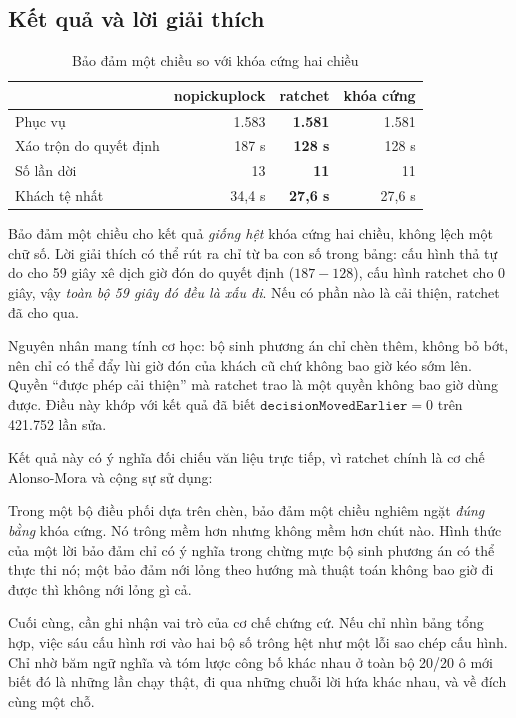 \subsection{Kết quả và lời giải thích}

\begin{table}[htbp]
\centering
\caption{Bảo đảm một chiều so với khóa cứng hai chiều}
\label{bang:ratchet}
\small
\begin{tabular}{@{}lrrr@{}}
\toprule
& \textbf{nopickuplock} & \textbf{ratchet} & \textbf{khóa cứng}\\
\midrule
Phục vụ & 1.583 & \textbf{1.581} & 1.581\\
Xáo trộn do quyết định & 187 s & \textbf{128 s} & 128 s\\
Số lần dời & 13 & \textbf{11} & 11\\
Khách tệ nhất & 34{,}4 s & \textbf{27{,}6 s} & 27{,}6 s\\
\bottomrule
\end{tabular}
\end{table}

Bảo đảm một chiều cho kết quả \emph{giống hệt} khóa cứng hai chiều, không lệch một chữ số. Lời
giải thích có thể rút ra chỉ từ ba con số trong bảng: cấu hình thả tự do cho 59 giây xê dịch giờ
đón do quyết định ($187 - 128$), cấu hình ratchet cho 0 giây, vậy \emph{toàn bộ 59 giây đó đều
là xấu đi}. Nếu có phần nào là cải thiện, ratchet đã cho qua.

Nguyên nhân mang tính cơ học: bộ sinh phương án chỉ chèn thêm, không bỏ bớt, nên chỉ có thể đẩy
lùi giờ đón của khách cũ chứ không bao giờ kéo sớm lên. Quyền ``được phép cải thiện'' mà ratchet
trao là một quyền không bao giờ dùng được. Điều này khớp với kết quả đã biết
$\mathtt{decisionMovedEarlier} = 0$ trên 421.752 lần sửa.

Kết quả này có ý nghĩa đối chiếu văn liệu trực tiếp, vì ratchet chính là cơ chế Alonso-Mora và
cộng sự sử dụng:

\begin{khungy}
Trong một bộ điều phối dựa trên chèn, bảo đảm một chiều nghiêm ngặt \emph{đúng bằng} khóa cứng.
Nó trông mềm hơn nhưng không mềm hơn chút nào. Hình thức của một lời bảo đảm chỉ có ý nghĩa
trong chừng mực bộ sinh phương án có thể thực thi nó; một bảo đảm nới lỏng theo hướng mà thuật
toán không bao giờ đi được thì không nới lỏng gì cả.
\end{khungy}

Cuối cùng, cần ghi nhận vai trò của cơ chế chứng cứ. Nếu chỉ nhìn bảng tổng hợp, việc sáu cấu
hình rơi vào hai bộ số trông hệt như một lỗi sao chép cấu hình. Chỉ nhờ băm ngữ nghĩa và tóm
lược công bố khác nhau ở toàn bộ 20/20 ô mới biết đó là những lần chạy thật, đi qua những chuỗi
lời hứa khác nhau, và về đích cùng một chỗ.

